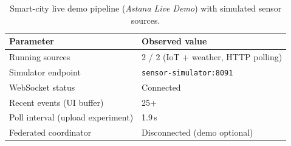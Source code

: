 \begin{table}[H]
  \centering
  \caption{Smart-city live demo pipeline (\emph{Astana Live Demo}) with simulated sensor sources.}
  \label{tab:smart-city-live-demo}
  \begin{tabular}{@{}ll@{}}
    \toprule
    \textbf{Parameter} & \textbf{Observed value} \\
    \midrule
    Running sources & 2 / 2 (IoT + weather, HTTP polling) \\
    Simulator endpoint & \texttt{sensor-simulator:8091} \\
    WebSocket status & Connected \\
    Recent events (UI buffer) & 25+ \\
    Poll interval (upload experiment) & 1.9\,s \\
    Federated coordinator & Disconnected (demo optional) \\
    \bottomrule
  \end{tabular}
\end{table}
